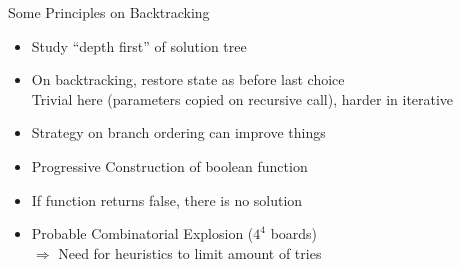 \begin{frame}{Some Principles on Backtracking}
  \begin{itemize}
  \item Study  ``depth first'' of solution tree
  \item On backtracking, restore state as before last choice\\
    Trivial here (parameters copied on recursive call), harder in iterative
  \item Strategy on branch ordering can improve things
  \item Progressive Construction of boolean function
  \item If function returns false, there is no solution

    \bigskip\pause
  \item Probable Combinatorial Explosion ($4^4$ boards)\\
    $\Rightarrow$ Need for heuristics to limit amount of tries
  \end{itemize}
\end{frame}

